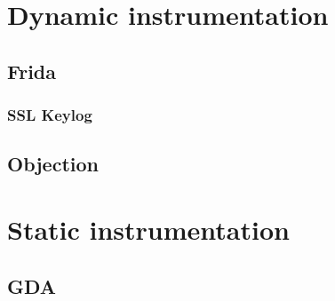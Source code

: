 	\section{Dynamic instrumentation}
		\subsection{Frida}
			
			\subsubsection{SSL Keylog}
			\label{subsec:frida_sslkeylog}
		
		\subsection{Objection}
		
	\section{Static instrumentation}
		\subsection{GDA}
